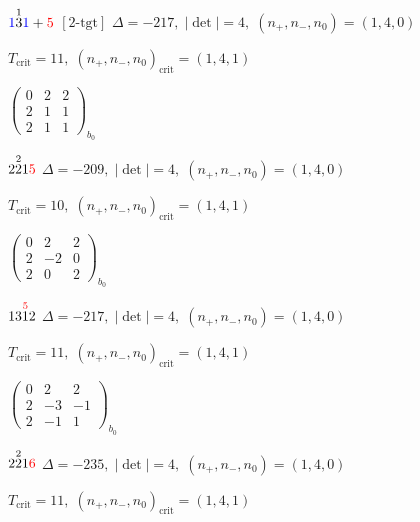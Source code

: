 \documentclass[10pt]{article}
\begin{document}
\smallskip

$\textcolor{blue}{1}\overset{1}{3}\textcolor{blue}{1}+\textcolor{red}{5}$ $\scriptstyle [2\text{-tgt}]$ \quad $\Delta=-217,\; |\det|=4,\; (n_+,n_-,n_0)=(1,4,0)$

\hspace{1em}$T_{\text{crit}}=11,\; (n_+,n_-,n_0)_{\text{crit}}=(1,4,1)$

\hspace{2em}$\left(\begin{smallmatrix}0 & 2 & 2 \\ 2 & 1 & 1 \\ 2 & 1 & 1\end{smallmatrix}\right)_{\!b_0}$

\smallskip

$2\overset{2}{2}1\textcolor{red}{5}$ \quad $\Delta=-209,\; |\det|=4,\; (n_+,n_-,n_0)=(1,4,0)$

\hspace{1em}$T_{\text{crit}}=10,\; (n_+,n_-,n_0)_{\text{crit}}=(1,4,1)$

\hspace{2em}$\left(\begin{smallmatrix}0 & 2 & 2 \\ 2 & -2 & 0 \\ 2 & 0 & 2\end{smallmatrix}\right)_{\!b_0}$

\smallskip

$13\overset{\textcolor{red}{5}}{1}2$ \quad $\Delta=-217,\; |\det|=4,\; (n_+,n_-,n_0)=(1,4,0)$

\hspace{1em}$T_{\text{crit}}=11,\; (n_+,n_-,n_0)_{\text{crit}}=(1,4,1)$

\hspace{2em}$\left(\begin{smallmatrix}0 & 2 & 2 \\ 2 & -3 & -1 \\ 2 & -1 & 1\end{smallmatrix}\right)_{\!b_0}$

\smallskip

$2\overset{2}{2}1\textcolor{red}{6}$ \quad $\Delta=-235,\; |\det|=4,\; (n_+,n_-,n_0)=(1,4,0)$

\hspace{1em}$T_{\text{crit}}=11,\; (n_+,n_-,n_0)_{\text{crit}}=(1,4,1)$
\end{document}
